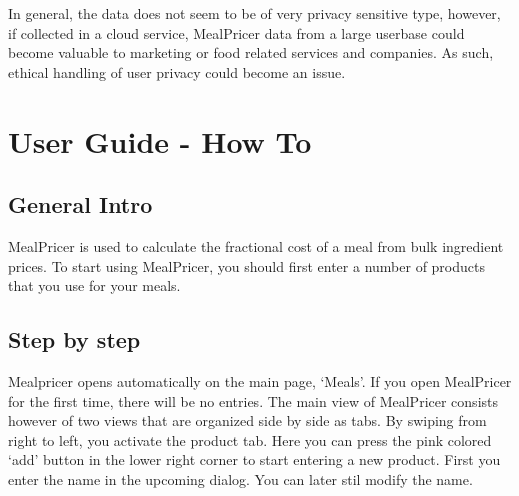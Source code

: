 \documentclass[a4paper,11pt,twoside]{article}
\begin{document}
In general, the data does not seem to be of very privacy sensitive type, however,
if collected in a cloud service, MealPricer data from a large userbase
could become valuable to marketing or food related services and companies. As such,
ethical handling of user privacy could become an issue.


\section{User Guide - How To}
\subsection{General Intro}
MealPricer is used to calculate the fractional cost of a meal from bulk
ingredient prices. To start using MealPricer, you should first enter a number
of products that you use for your meals.

\subsection{Step by step}
Mealpricer opens automatically on the main page, `Meals'. If you open MealPricer
for the first time, there will be no entries. The main view of MealPricer
consists however of two views that are organized side by side as tabs. By
swiping from right to left, you activate the product tab. Here you can press
the pink colored `add'  button in the lower right corner to start entering a new
product. First you enter the name in the upcoming dialog. You can later stil
modify the name.
\end{document}
